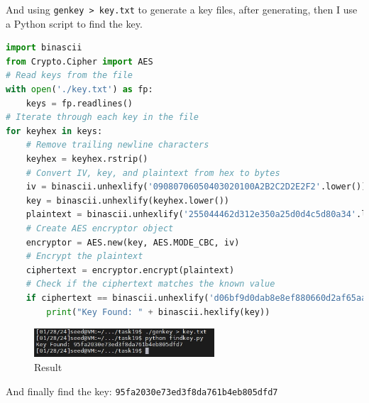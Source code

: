 \documentclass[a4paper,11pt]{article}
\begin{document}
And using \verb|genkey > key.txt| to generate a key files, after generating, then I use a Python script to find the key.
\begin{lstlisting}[caption={Python Script for Finding the Key},label={lst:task19-2},language=PYTHON,breaklines=true]
import binascii
from Crypto.Cipher import AES
# Read keys from the file
with open('./key.txt') as fp:
    keys = fp.readlines()
# Iterate through each key in the file
for keyhex in keys:
    # Remove trailing newline characters
    keyhex = keyhex.rstrip()
    # Convert IV, key, and plaintext from hex to bytes
    iv = binascii.unhexlify('09080706050403020100A2B2C2D2E2F2'.lower())
    key = binascii.unhexlify(keyhex.lower())
    plaintext = binascii.unhexlify('255044462d312e350a25d0d4c5d80a34'.lower())
    # Create AES encryptor object
    encryptor = AES.new(key, AES.MODE_CBC, iv)
    # Encrypt the plaintext
    ciphertext = encryptor.encrypt(plaintext)
    # Check if the ciphertext matches the known value
    if ciphertext == binascii.unhexlify('d06bf9d0dab8e8ef880660d2af65aa82'.lower()):
        print("Key Found: " + binascii.hexlify(key))
\end{lstlisting} 
\begin{figure}[h]
    \centering
       \includegraphics[width=0.6\textwidth]{figures/task19/result.png}
    \caption{Result}\label{fig:task19result}
\end{figure}
And finally find the key: \verb|95fa2030e73ed3f8da761b4eb805dfd7|
\end{document}
